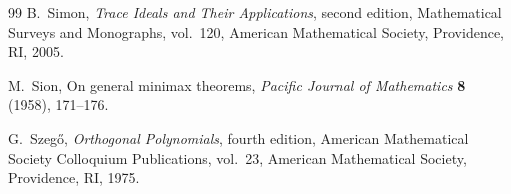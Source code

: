\documentclass[11pt]{article}
\begin{document}
\begin{thebibliography}{99}
B.~Simon,
\newblock \emph{Trace Ideals and Their Applications}, second edition,
\newblock Mathematical Surveys and Monographs, vol.~120,
American Mathematical Society, Providence, RI, 2005.

M.~Sion,
\newblock On general minimax theorems,
\newblock \emph{Pacific Journal of Mathematics} \textbf{8} (1958),
171--176.

G.~Szeg\H{o},
\newblock \emph{Orthogonal Polynomials}, fourth edition,
\newblock American Mathematical Society Colloquium Publications, vol.~23,
American Mathematical Society, Providence, RI, 1975.

\end{thebibliography}
\end{document}
